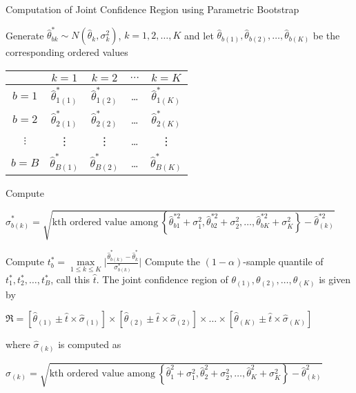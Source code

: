 \documentclass[
  12pt,
  a4paper,
]{article}
\numberwithin{equation}{section}
\begin{document}
\begin{algorithm}[H]
    \caption{Computation of Joint Confidence Region using Parametric Bootstrap} 
    \label{alg:parametricbs_ci}
    \begin{algorithmic}[1]
                \State Generate $\hat\theta^*_{bk} \sim N \left( \hat\theta_k, \sigma_k^2 \right)$, $k = 1, 2, \dots, K$ and let $\hat{\theta}_{b(1)}, \hat{\theta}_{b(2)}, \dots, \hat{\theta}_{b(K)}$ be the corresponding ordered values
            \Statex \begin{minipage}{\linewidth}
          \centering
          \begin{tabular}{|c|c|c|c|c|}
            \hline
             & $k = 1$ & $k = 2$ & $\dots$ & $k = K$ \\
            \hline
            $b = 1$ & $\hat{\theta}^*_{1(1)}$ & $\hat{\theta}^*_{1(2)}$ & \dots & $\hat{\theta}^*_{1(K)}$ \\
            \hline
            $b = 2$ & $\hat{\theta}^*_{2(1)}$ & $\hat{\theta}^*_{2(2)}$ & \dots & $\hat{\theta}^*_{2(K)}$ \\
            \hline
            $\vdots$ & \vdots & \vdots & \dots & \vdots\\
            \hline
            $b = B$ & $\hat{\theta}^*_{B(1)}$ & $\hat{\theta}^*_{B(2)}$ & \dots & $\hat{\theta}^*_{B(K)}$ \\
            \hline
          \end{tabular}
        \end{minipage}
        \State Compute 
        \Statex \begin{minipage}{\linewidth}
        \centering
$\hat\sigma^*_{b(k)} = \sqrt{\text{kth ordered value among} \ \left\{ \hat{\theta}^{*2}_{b1} + \sigma_1^2, \hat{\theta}^{*2}_{b2} + \sigma_2^2, \dots, \hat{\theta}^{*2}_{bK} + \sigma_K^2 \right\} - \hat {\theta}^{*2}_{(k)}}$
        \end{minipage}
                \State Compute $t^*_b = \underset{1 \leq k \leq K}{\max} \Bigg| \frac{\hat\theta^*_{b(k)} - \hat\theta^*_{k}}{\sigma^*_{b(k)}} \Bigg|$
        \EndFor
        \State Compute the $\left(1-\alpha\right)$-sample quantile of $t^*_1, t^*_2, \dots, t^*_B$, call this $\hat{t}$.
        \State The joint confidence region of $\theta_{(1)}, \theta_{(2)}, \dots, \theta_{(K)}$ is given by 
        \Statex \begin{minipage}{\linewidth}
    \centering
$\mathfrak{R} = \left[ \hat\theta_{(1)} \pm \hat t \times \hat\sigma_{(1)}  \right] \times \left[ \hat\theta_{(2)} \pm \hat t \times \hat\sigma_{(2)}  \right] \times \dots \times \left[ \hat\theta_{(K)} \pm \hat t \times \hat\sigma_{(K)}  \right]$
    \end{minipage}
         where $\hat \sigma_{(k)}$ is computed as
        \Statex \begin{minipage}{\linewidth}
    \centering
$\hat\sigma_{(k)} = \sqrt{\text{kth ordered value among} \ \left\{ \hat{\theta}^{2}_{1} + \sigma_1^2, \hat{\theta}^{2}_{2} + \sigma_2^2, \dots, \hat{\theta}^{2}_{K} + \sigma_K^2 \right\} - \hat {\theta}^{2}_{(k)}}$
\end{minipage}
    \end{algorithmic} 
\end{algorithm}
\end{document}
